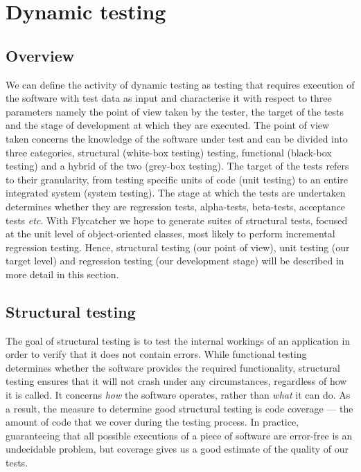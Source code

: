 \documentclass[a4paper,11pt,titlepage]{report}
\begin{document}
\section{Dynamic testing}

\subsection{Overview}

We can define the activity of dynamic testing as testing that requires execution of the software with test data as input \cite{mahmood2007systematic} and characterise it with respect to three parameters namely the point of view taken by the tester, the target of the tests and the stage of development at which they are executed. The point of view taken concerns the knowledge of the software under test and can be divided into three categories, structural (white-box testing) testing, functional (black-box testing) and a hybrid of the two (grey-box testing). The target of the tests refers to their granularity, from testing specific units of code (unit testing) to an entire integrated system (system testing). The stage at which the tests are undertaken determines whether they are regression tests, alpha-tests, beta-tests, acceptance tests \emph{etc}. With Flycatcher we hope to generate suites of structural tests, focused at the unit level of object-oriented classes, most likely to perform incremental regression testing. Hence, structural testing (our point of view), unit testing (our target level) and regression testing (our development stage) will be described in more detail in this section.

\subsection{Structural testing}

The goal of structural testing is to test the internal workings \cite{mcminn2004search} of an application in order to verify that it does not contain errors. While functional testing determines whether the software provides the required functionality, structural testing ensures that it will not crash under any circumstances, regardless of how it is called. It concerns \emph{how} the software operates, rather than \emph{what} it can do. As a result, the measure to determine good structural testing is code coverage --- the amount of code that we cover during the testing process. In practice, guaranteeing that all possible executions of a piece of software are error-free is an undecidable problem, but coverage gives us a good estimate of the quality of our tests.
\end{document}
